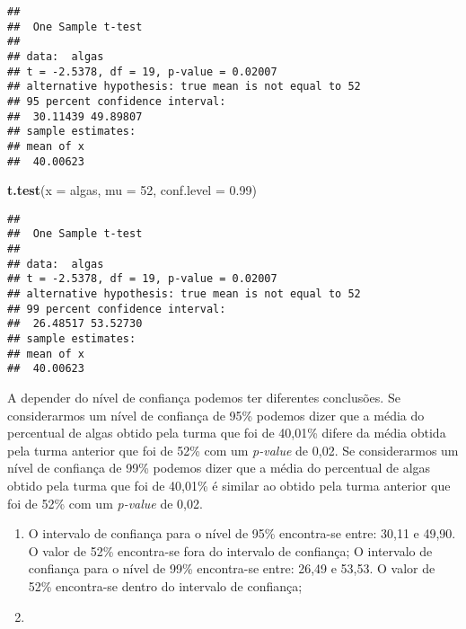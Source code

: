 \documentclass[14pt,titlepage, oneside, openany, a4paper]{book}
\newenvironment{Shaded}{\begin{snugshade}}{\end{snugshade}}
\newcommand{\DataTypeTok}[1]{\textcolor[rgb]{0.13,0.29,0.53}{#1}}
\newcommand{\DecValTok}[1]{\textcolor[rgb]{0.00,0.00,0.81}{#1}}
\newcommand{\FloatTok}[1]{\textcolor[rgb]{0.00,0.00,0.81}{#1}}
\newcommand{\KeywordTok}[1]{\textcolor[rgb]{0.13,0.29,0.53}{\textbf{#1}}}
\newcommand{\NormalTok}[1]{#1}
\newcommand{\OperatorTok}[1]{\textcolor[rgb]{0.81,0.36,0.00}{\textbf{#1}}}
\newcommand{\StringTok}[1]{\textcolor[rgb]{0.31,0.60,0.02}{#1}}
\begin{document}
\begin{verbatim}
## 
##  One Sample t-test
## 
## data:  algas
## t = -2.5378, df = 19, p-value = 0.02007
## alternative hypothesis: true mean is not equal to 52
## 95 percent confidence interval:
##  30.11439 49.89807
## sample estimates:
## mean of x 
##  40.00623
\end{verbatim}

\begin{Shaded}
\begin{Highlighting}[]
\KeywordTok{t.test}\NormalTok{(}\DataTypeTok{x =}\NormalTok{ algas, }\DataTypeTok{mu =} \DecValTok{52}\NormalTok{, }\DataTypeTok{conf.level =} \FloatTok{0.99}\NormalTok{)}
\end{Highlighting}
\end{Shaded}

\begin{verbatim}
## 
##  One Sample t-test
## 
## data:  algas
## t = -2.5378, df = 19, p-value = 0.02007
## alternative hypothesis: true mean is not equal to 52
## 99 percent confidence interval:
##  26.48517 53.52730
## sample estimates:
## mean of x 
##  40.00623
\end{verbatim}

A depender do nível de confiança podemos ter diferentes conclusões. Se considerarmos um nível de confiança de 95\% podemos dizer que a média do percentual de algas obtido pela turma que foi de 40,01\% difere da média obtida pela turma anterior que foi de 52\% com um \emph{p-value} de 0,02. Se considerarmos um nível de confiança de 99\% podemos dizer que a média do percentual de algas obtido pela turma que foi de 40,01\% é similar ao obtido pela turma anterior que foi de 52\% com um \emph{p-value} de 0,02.

\begin{enumerate}
\def\labelenumi{\arabic{enumi})}
\setcounter{enumi}{1}
\item
  O intervalo de confiança para o nível de 95\% encontra-se entre: 30,11 e 49,90. O valor de 52\% encontra-se fora do intervalo de confiança;
  O intervalo de confiança para o nível de 99\% encontra-se entre: 26,49 e 53,53. O valor de 52\% encontra-se dentro do intervalo de confiança;
\item
\end{enumerate}

\begin{Shaded}
\end{Shaded}
\end{document}
